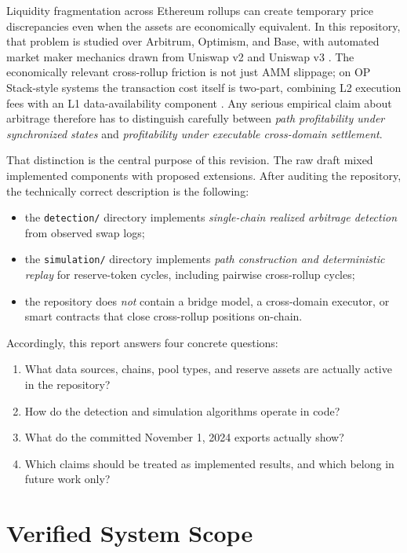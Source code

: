 \documentclass[11pt]{article}
\begin{document}
Liquidity fragmentation across Ethereum rollups can create temporary price discrepancies even when the assets are economically equivalent. In this repository, that problem is studied over Arbitrum, Optimism, and Base, with automated market maker mechanics drawn from Uniswap v2 and Uniswap v3 \cite{uniswapv2,uniswapv3}. The economically relevant cross-rollup friction is not just AMM slippage; on OP Stack-style systems the transaction cost itself is two-part, combining L2 execution fees with an L1 data-availability component \cite{opfees,basedocs}. Any serious empirical claim about arbitrage therefore has to distinguish carefully between \emph{path profitability under synchronized states} and \emph{profitability under executable cross-domain settlement}.

That distinction is the central purpose of this revision. The raw draft mixed implemented components with proposed extensions. After auditing the repository, the technically correct description is the following:
\begin{itemize}[leftmargin=1.5em]
    \item the \texttt{detection/} directory implements \emph{single-chain realized arbitrage detection} from observed swap logs;
    \item the \texttt{simulation/} directory implements \emph{path construction and deterministic replay} for reserve-token cycles, including pairwise cross-rollup cycles;
    \item the repository does \emph{not} contain a bridge model, a cross-domain executor, or smart contracts that close cross-rollup positions on-chain.
\end{itemize}

Accordingly, this report answers four concrete questions:
\begin{enumerate}[label=\arabic*.]
    \item What data sources, chains, pool types, and reserve assets are actually active in the repository?
    \item How do the detection and simulation algorithms operate in code?
    \item What do the committed November 1, 2024 exports actually show?
    \item Which claims should be treated as implemented results, and which belong in future work only?
\end{enumerate}

\section{Verified System Scope}
\end{document}
